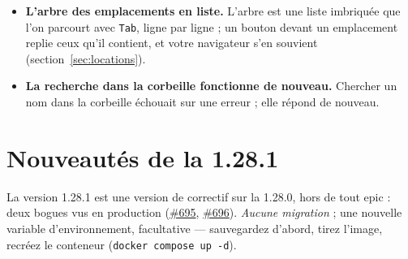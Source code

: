 \begin{itemize}
        rangement peut porter un court texte --- « bibliothèque de
        gauche, étagère du haut » --- affiché sur sa page et renvoyé par
        l'API (section~\ref{sec:location-description}).
  \item \textbf{L'arbre des emplacements en liste.} L'arbre est une
        liste imbriquée que l'on parcourt avec \texttt{Tab}, ligne par
        ligne ; un bouton devant un emplacement replie ceux qu'il
        contient, et votre navigateur s'en souvient
        (section~\ref{sec:locations}).
  \item \textbf{La recherche dans la corbeille fonctionne de nouveau.}
        Chercher un nom dans la corbeille échouait sur une erreur ; elle
        répond de nouveau.
\end{itemize}

\section{Nouveautés de la 1.28.1}\label{sec:whats-new-1.28.1}

La version 1.28.1 est une version de correctif sur la 1.28.0, hors de
tout epic : deux bogues vus en production
(\href{https://github.com/guycorbaz/mybibli/issues/695}{\#695},
\href{https://github.com/guycorbaz/mybibli/issues/696}{\#696}).
\emph{Aucune migration} ; une nouvelle variable d'environnement,
facultative --- sauvegardez d'abord, tirez l'image, recréez le
conteneur (\texttt{docker compose up -d}).


